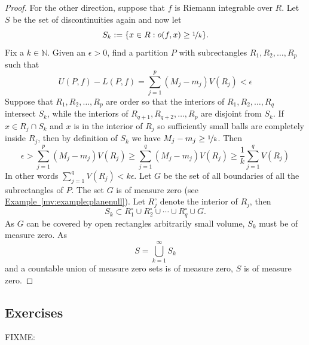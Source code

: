 \documentclass[12pt]{book}
\newcommand{\N}{{\mathbb{N}}}
\theoremstyle{plain}
\theoremstyle{remark}
\theoremstyle{definition}
\theoremstyle{exercise}
\theoremstyle{example}
\newtheorem{example}[thm]{Example}
\newcommand{\exampleref}[1]{\hyperref[#1]{Example~\ref*{#1}}}
\begin{document}
\begin{proof}
For the other direction, suppose that $f$ is Riemann integrable
over $R$.
Let $S$ be the set of discontinuities again and now let
\begin{equation*}
S_k := \{ x \in R : o(f,x) \geq \nicefrac{1}{k} \}.
\end{equation*}
Fix a $k \in \N$.
Given an $\epsilon > 0$, find a partition $P$ with subrectangles
$R_1,R_2,\ldots,R_p$ such that
\begin{equation*}
U(P,f)-L(P,f) =
\sum_{j=1}^p (M_j-m_j) V(R_j)
< \epsilon
\end{equation*}
Suppose that $R_1,R_2,\ldots,R_p$ are order so that
the interiors of $R_1,R_2,\ldots,R_{q}$ intersect $S_k$,
while the interiors of $R_{q+1},R_{q+2},\ldots,R_p$
are disjoint from $S_k$.  If $x \in R_j \cap S_k$
and $x$ is in the interior of $R_j$ so
sufficiently small balls are completely inside $R_j$,
then by definition of $S_k$ we have
$M_j-m_j \geq \nicefrac{1}{k}$.
Then
\begin{equation*}
\epsilon >
\sum_{j=1}^p (M_j-m_j) V(R_j)
\geq
\sum_{j=1}^q (M_j-m_j) V(R_j)
\geq
\frac{1}{k}
\sum_{j=1}^q V(R_j)
\end{equation*}
In other words
$\sum_{j=1}^q V(R_j) < k \epsilon$.
Let $G$ be the set of all boundaries of all the subrectangles
of $P$.  The set $G$ is of measure zero (see \exampleref{mv:example:planenull}).
Let $R_j^\circ$ denote the interior of $R_j$, then
\begin{equation*}
S_k \subset R_1^\circ \cup R_2^\circ \cup \cdots \cup R_q^\circ \cup G .
\end{equation*}
As $G$ can be covered by open rectangles arbitrarily small volume,
$S_k$ must be of measure zero.  As
\begin{equation*}
S = \bigcup_{k=1}^\infty S_k
\end{equation*}
and a countable union of measure zero sets is of measure zero, 
$S$ is of measure zero.
\end{proof}

%

\subsection{Exercises}

FIXME:


\end{document}
